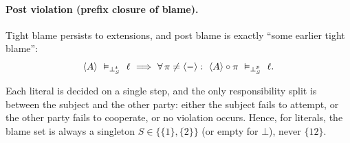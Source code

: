 \begin{definition}
\paragraph{Post violation (prefix closure of blame).}
Tight blame persists to extensions, and post blame is exactly “some earlier tight blame”:
\[
\trace{A}\ \vDash_{\bottp{S}}\ \ell\ \Longrightarrow\ 
\forall\,\pi\ne\emptytrace:\ \trace{A}\concat\pi\ \vDash_{\botpp{S}}\ \ell.
\]
\end{definition}

\begin{remark}
    Each literal is decided on a single step, and the only responsibility split is between the subject and the other party:
    either the subject fails to attempt, or the other party fails to cooperate, or no violation occurs. Hence, for literals, the blame set is always a singleton \(S\in\{\{1\},\{2\}\}\) (or empty for \(\bot\)), never \(\{12\}\).
\end{remark}


